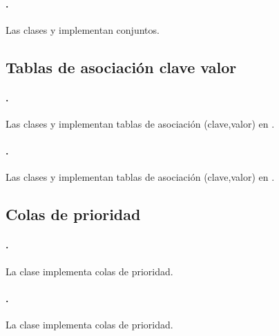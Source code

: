 \paragraph{\java.} Las clases  y  implementan
  conjuntos.

\subsection{Tablas de asociación clave valor}
\label{tech-map}
\paragraph{\cpp.} Las clases  y  implementan tablas de
  asociación (clave,valor) en \cpp.
\paragraph{\java.} Las clases  y  implementan tablas de
  asociación (clave,valor) en \java.

\subsection{Colas de prioridad}
\label{tech-priority-queue}
\paragraph{\cpp.} La clase  implementa colas de prioridad.
\paragraph{\java.} La clase  implementa colas de prioridad.

